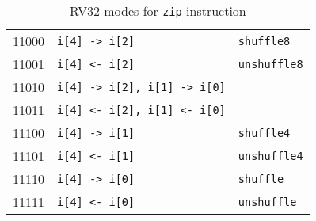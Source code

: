 \begin{table}[h]
\begin{small}
\begin{center}
\begin{tabular}{l l l}
\hline

      11000  & {\tt i[4] -> i[2]}               & {\tt shuffle8} \\
      11001  & {\tt i[4] <- i[2]}               & {\tt unshuffle8} \\
      11010  & {\tt i[4] -> i[2], i[1] -> i[0]} & \\
      11011  & {\tt i[4] <- i[2], i[1] <- i[0]} & \\
      11100  & {\tt i[4] -> i[1]}               & {\tt shuffle4} \\
      11101  & {\tt i[4] <- i[1]}               & {\tt unshuffle4} \\
      11110  & {\tt i[4] -> i[0]}               & {\tt shuffle} \\
      11111  & {\tt i[4] <- i[0]}               & {\tt unshuffle} \\

\end{tabular}
\end{center}
\end{small}
\caption{RV32 modes for {\tt zip} instruction}
\label{zip-modes}
\end{table}


